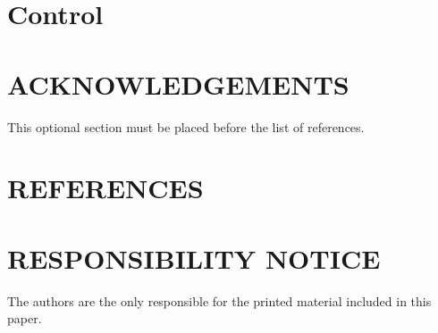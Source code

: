 \documentclass[10pt,fleqn,a4paper,twoside]{article}
\begin{document}
	\section{Control}
	
	\section{ACKNOWLEDGEMENTS}
	
	This optional section must be placed before the list of references.
	
	\section{REFERENCES} 
	
	
	\renewcommand{\refname}{}
	
	
	\section{RESPONSIBILITY NOTICE}
	
	The authors are the only responsible for the printed material included in this paper.
	
\end{document}
